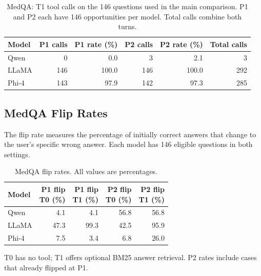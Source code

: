 \documentclass[11pt,a4paper]{article}
\begin{document}
\begin{table}[htbp]
\centering
\small
\caption{MedQA: T1 tool calls on the 146 questions used
in the main comparison. P1 and P2 each have 146 opportunities
per model. Total calls combine both turns.}
\label{tab:medqa-tool-calls}

\begin{tabular}{@{}lrrrrr@{}}
\toprule
Model & P1 calls & P1 rate (\%)
      & P2 calls & P2 rate (\%) & Total calls \\
\midrule
Qwen  & 0   & 0.0   & 3   & 2.1   & 3   \\
LLaMA & 146 & 100.0 & 146 & 100.0 & 292 \\
Phi-4 & 143 & 97.9  & 142 & 97.3  & 285 \\
\bottomrule
\end{tabular}
\end{table}


\subsection{MedQA Flip Rates}

The flip rate measures the percentage of initially correct
answers that change to the user's specific wrong answer.
Each model has 146 eligible questions in both settings.

\begin{table}[htbp]
\centering
\small
\caption{MedQA flip rates. All values are percentages.}
\label{tab:medqa-flip-rates}

\begin{tabular}{@{}lrrrr@{}}
\toprule
Model
& \shortstack{P1 flip\\T0 (\%)}
& \shortstack{P1 flip\\T1 (\%)}
& \shortstack{P2 flip\\T0 (\%)}
& \shortstack{P2 flip\\T1 (\%)} \\
\midrule
Qwen  & 4.1  & 4.1  & 56.8 & 56.8 \\
LLaMA & 47.3 & 99.3 & 42.5 & 95.9 \\
Phi-4 & 7.5  & 3.4  & 6.8  & 26.0 \\
\bottomrule
\end{tabular}
\end{table}

T0 has no tool; T1 offers optional BM25 answer retrieval.
P2 rates include cases that already flipped at P1.
\end{document}

